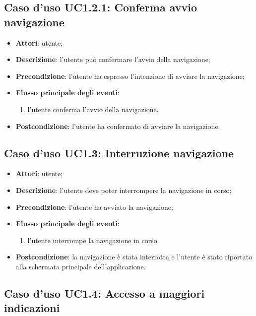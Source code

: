 \documentclass[../AnalisiDeiRequisiti.tex]{subfiles}
\begin{document}
\subsection{Caso d'uso UC1.2.1: Conferma avvio navigazione}
\begin{itemize}
	\item \textbf{Attori}: utente;
	\item \textbf{Descrizione}: l'utente può confermare l'avvio della navigazione; 
	\item \textbf{Precondizione}: l'utente ha espresso l'intenzione di avviare la navigazione;
	
	\item \textbf{Flusso principale degli eventi}:
	\begin{enumerate}
		\item l'utente conferma l'avvio della navigazione.
		
	\end{enumerate}
	\item \textbf{Postcondizione}: l'utente ha confermato di avviare la navigazione.
\end{itemize}
\hypertarget{UC1.3}{}
\subsection{Caso d'uso UC1.3: Interruzione navigazione}
\begin{itemize}
	\item \textbf{Attori}: utente;
	\item \textbf{Descrizione}: l'utente deve poter interrompere la navigazione in corso; 
	\item \textbf{Precondizione}: l'utente ha avviato la navigazione;
	
	\item \textbf{Flusso principale degli eventi}:
	\begin{enumerate}
		\item l'utente interrompe la navigazione in corso.
		
	\end{enumerate}
	\item \textbf{Postcondizione}: la navigazione è stata interrotta e l'utente è stato riportato alla schermata principale dell'applicazione.
\end{itemize}
\hypertarget{UC1.4}{}
\subsection{Caso d'uso UC1.4: Accesso a maggiori indicazioni}
\end{document}
